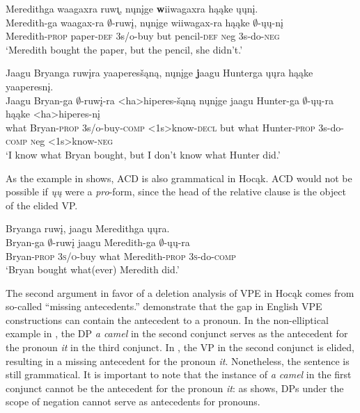 \documentclass[output=paper]{LSP/langsci}
\begin{document}
\ea
\ea\label{ex:johnson:47a} 
\glll Meredithga waagaxra ruw\k{\i}, nųnįge {\textbf wiiwagaxra} hąąke ųųnį.\\
Meredith-ga waagax-ra $\emptyset$-ruwį, nųnįge wiiwagax-ra hąąke $\emptyset$-ųų-nį\\
Meredith-\textsc{prop} paper-\textsc{def} {\textsc 3s/o}-buy but pencil-\textsc{def} {\textsc neg} {\textsc 3s}-do-\textsc{neg}\\
\trans `Meredith bought the paper, but the pencil, she didn't.'
 
\ex\label{ex:johnson:47b} 
\glll Jaagu Bryanga ruwįra yaaperesšąną, nųnįge {\textbf jaagu} Hunterga ųųra hąąke yaaperesnį.\\
Jaagu Bryan-ga $\emptyset$-ruwį-ra <ha>hiperes-šąną nųnįge jaagu Hunter-ga $\emptyset$-ųų-ra hąąke <ha>hiperes-nį\\
what Bryan-\textsc{prop} {\textsc 3s/o}-buy-\textsc{comp} <{\textsc 1s}>know-\textsc{decl} but what Hunter-\textsc{prop} {\textsc 3s}-do-\textsc{comp} {\textsc neg} <{\textsc 1s}>know-\textsc{neg}\\
\trans `I know what Bryan bought, but I don't know what Hunter did.'
\z
\z

As the example in  shows, ACD is also grammatical in Hocąk. ACD would not be possible if \emph{ųų} were a \emph{pro}-form, since the head of the relative clause is the object of the elided VP.
 
\ea\label{ex:johnson:48} 
\glll Bryanga ruwį, jaagu Meredithga ųųra.\\
Bryan-ga $\emptyset$-ruwį jaagu Meredith-ga $\emptyset$-ųų-ra\\
Bryan-\textsc{prop} \textsc{3s/o}-buy what Meredith-\textsc{prop} \textsc{3s}-do-\textsc{comp}\\
\trans `Bryan bought what(ever) Meredith did.'
\z

The second argument in favor of a deletion analysis of VPE in Hocąk comes from so-called ``missing antecedents.'' \citet{HankamerSag1976} demonstrate that the gap in English VPE constructions can contain the antecedent to a pronoun. In the non-elliptical example in , the DP \emph{a camel} in the second conjunct serves as the antecedent for the pronoun \emph{it} in the third conjunct. In , the VP in the second conjunct is elided, resulting in a missing antecedent for the pronoun \emph{it}. Nonetheless, the sentence is still grammatical. It is important to note that the instance of \emph{a camel} in the first conjunct cannot be the antecedent for the pronoun \emph{it}: as  shows, DPs under the scope of negation cannot serve as antecedents for pronouns.
\end{document}
